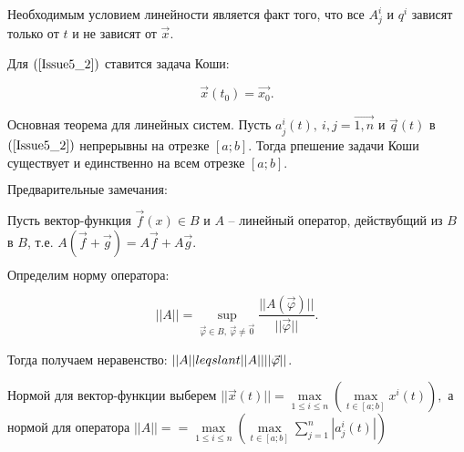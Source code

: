 $\textbf{Необходимым условием линейности}$ является факт того, что все $A_j^i$ и $q^i$ зависят только от $t$ и не зависят от $\vec{x}$.

Для $(\ref{Issue5_2})$ ставится задача Коши:

\[ \vec{x}(t_0) = \vec{x_0}.\]

\begin{theorem}

$\textbf{Основная теорема для линейных систем.}$ Пусть $a_j^i(t),\ i,j = \vec{1,n}$ и $\vec{q}(t)$ в $(\ref{Issue5_2})$ непрерывны на отрезке $[a;b]$. Тогда рпешение задачи Коши существует и единственно на всем отрезке $[a;b].$

\end{theorem}

$\textbf{Предварительные замечания:}$

Пусть вектор-функция $\vec{f}(x) \in B$ и $A$ -- линейный оператор, действубщий из $B$ в $B$, т.е. $A(\vec{f} + \vec{g}) = A\vec{f} + A\vec{g}$.

$\textbf{Определим норму оператора:}$

\[ ||A|| =  \sup\limits_{\vec{\varphi} \in B,\ \vec{\varphi} \neq \vec{0}} \frac{||A(\vec{\varphi})||}{||\vec{\varphi}||}. \]

Тогда получаем неравенство: $||A|| \\leqslant ||A||||\vec{\varphi}||$.

Нормой для вектор-функции выберем $||\vec{x}(t)|| = \max\limits_{1 \leqslant i \leqslant n} (\max\limits_{t \in [a;b]} x^i(t)),$ а нормой для оператора $||A|| = = \max\limits_{1 \leqslant i \leqslant n} (\max\limits_{t \in [a;b]} \sum\limits_{j = 1}^{n} |a_j^i(t)|)$

